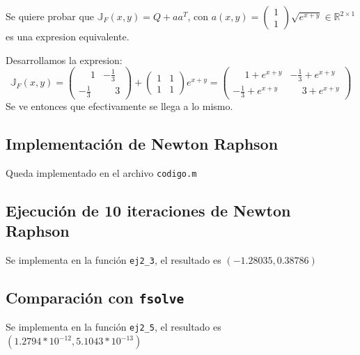 \documentclass{endm}
\begin{document}
    Se quiere probar que $\mathbb{J}_F(x,y) = Q + aa^T$, con $a(x,y) = \begin{pmatrix} 1\\1 \end{pmatrix}\sqrt{e^{x+y}} \in \mathbb{R}^{2 \times 1}$
    es una expresion equivalente.
    
    Desarrollamos la expresion:
    \begin{equation}
        \mathbb{J}_F(x,y) = 
        \begin{pmatrix}
            \phantom{-}1 & -\frac{1}{3} \\
            -\frac{1}{3} & \phantom{-}3
        \end{pmatrix}
        +
        \begin{pmatrix} 1 & 1 \\ 1 & 1 \end{pmatrix} e^{x+y}
        =
        \begin{pmatrix}
            \phantom{-}1 + e^{x+y} & -\frac{1}{3} + e^{x+y} \\
            -\frac{1}{3} + e^{x+y} & \phantom{-}3 + e^{x+y}
        \end{pmatrix}
    \end{equation}
    Se ve entonces que efectivamente se llega a lo mismo.

\subsection{Implementación de Newton Raphson}
Queda implementado en el archivo \lstinline[style=mystyle]{codigo.m}

\subsection{Ejecución de 10 iteraciones de Newton Raphson}
Se implementa en la función \lstinline[style=mystyle]{ej2_3}, el resultado es $(-1.28035, 0.38786)$

\subsection{Comparación con \lstinline[style=mystyle]{fsolve}}
Se implementa en la función  \lstinline[style=mystyle]{ej2_5}, el resultado es $(1.2794*10^{-12},5.1043*10^{-13})$

\end{document}
